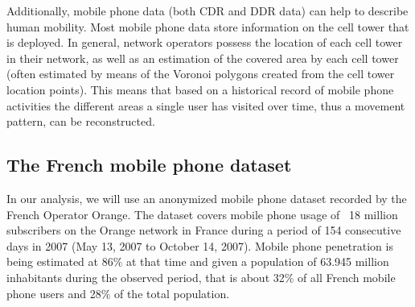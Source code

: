 \documentclass[a4paper]{article}
\begin{document}
\begin{table}[ht]
\medskip
\centering %
\caption[Example of Call Detailed Records.]{Example of Call Detailed Records data}%
\label{table:CDR-example} %
\end{table}


Additionally, mobile phone data (both CDR and DDR data) can help to describe human mobility. Most mobile phone data store information on the cell tower that is deployed. In general, network operators possess the location of each cell tower in their network, as well as an estimation of the covered area by each cell tower (often estimated by means of the Voronoi polygons created from the cell tower location points). This means that based on a historical record of mobile phone activities the different areas a single user has visited over time, thus a movement pattern, can be reconstructed. 

\subsection{The French mobile phone dataset}

In our analysis, we will use an anonymized mobile phone dataset recorded by the French Operator Orange. The dataset covers mobile phone usage of ~18 million subscribers on the Orange network in France during a period of 154 consecutive days in 2007 (May 13, 2007 to October 14, 2007). Mobile phone penetration is being estimated at 86\% at that time and given a population of 63.945 million inhabitants during the observed period, that is about 32\% of all French mobile phone users and 28\% of the total population.
\end{document}
